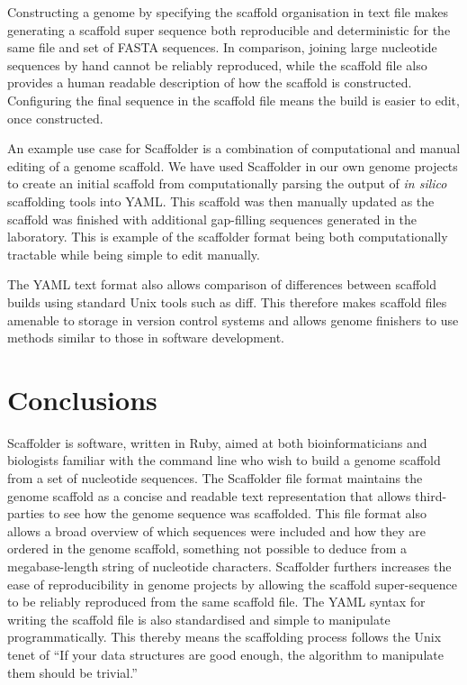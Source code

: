 \documentclass[10pt]{bmc_article}
\newenvironment{bmcformat}{\begin{raggedright}\baselineskip20pt\sloppy\setboolean{publ}{false}}{\end{raggedright}\baselineskip20pt\sloppy}
\begin{document}
\begin{bmcformat}
Constructing a genome by specifying the scaffold organisation in text file
makes generating a scaffold super sequence both reproducible and deterministic
for the same file and set of FASTA sequences. In comparison, joining large
nucleotide sequences by hand cannot be reliably reproduced, while the scaffold
file also provides a human readable description of how the scaffold is
constructed. Configuring the final sequence in the scaffold file means the
build is easier to edit, once constructed. \pb

An example use case for Scaffolder is a combination of computational and manual
editing of a genome scaffold. We have used Scaffolder in our own genome
projects to create an initial scaffold from computationally parsing the output
of \emph{in silico} scaffolding tools into YAML. This scaffold was then
manually updated as the scaffold was finished with additional gap-filling
sequences generated in the laboratory. This is example of the scaffolder format
being both computationally tractable while being simple to edit manually. \pb

The YAML text format also allows comparison of differences between scaffold
builds using standard Unix tools such as diff. This therefore makes scaffold
files amenable to storage in version control systems and allows genome
finishers to use methods similar to those in software development. \pb 

\clearpage

\section*{Conclusions} %

Scaffolder is software, written in Ruby, aimed at both bioinformaticians and
biologists familiar with the command line who wish to build a genome scaffold
from a set of nucleotide sequences. The Scaffolder file format maintains the
genome scaffold as a concise and readable text representation that allows
third-parties to see how the genome sequence was scaffolded. This file format
also allows a broad overview of which sequences were included and how they are
ordered in the genome scaffold, something not possible to deduce from a
megabase-length string of nucleotide characters. Scaffolder furthers increases
the ease of reproducibility in genome projects by allowing the scaffold
super-sequence to be reliably reproduced from the same scaffold file. The YAML
syntax for writing the scaffold file is also standardised and simple to
manipulate programmatically. This thereby means the scaffolding process follows
the Unix tenet of ``If your data structures are good enough, the algorithm to
manipulate them should be trivial.''


\end{bmcformat}
\end{document}
